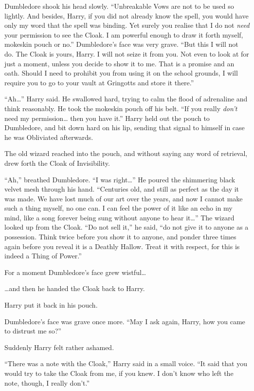Dumbledore shook his head slowly. ``Unbreakable Vows are not to be used
so lightly. And besides, Harry, if you did not already know the spell,
you would have only my word that the spell was binding. Yet surely you
realise that I do not \emph{need} your permission to see the Cloak. I am
powerful enough to draw it forth myself, mokeskin pouch or no.''
Dumbledore's face was very grave. ``But this I will not do. The Cloak is
yours, Harry. I will not seize it from you. Not even to look at for just
a moment, unless you decide to show it to me. That is a promise and an
oath. Should I need to prohibit you from using it on the school grounds,
I will require you to go to your vault at Gringotts and store it
there.''

``Ah\ldots{}'' Harry said. He swallowed hard, trying to calm the flood
of adrenaline and think reasonably. He took the mokeskin pouch off his
belt. ``If you really \emph{don't} need my permission\ldots{} then you
have it.'' Harry held out the pouch to Dumbledore, and bit down hard on
his lip, sending that signal to himself in case he was Obliviated
afterwards.

The old wizard reached into the pouch, and without saying any word of
retrieval, drew forth the Cloak of Invisibility.

``Ah,'' breathed Dumbledore. ``I was right\ldots{}'' He poured the
shimmering black velvet mesh through his hand. ``Centuries old, and
still as perfect as the day it was made. We have lost much of our art
over the years, and now I cannot make such a thing myself, no one can. I
can feel the power of it like an echo in my mind, like a song forever
being sung without anyone to hear it\ldots{}'' The wizard looked up from
the Cloak. ``Do not sell it,'' he said, ``do not give it to anyone as a
possession. Think twice before you show it to anyone, and ponder three
times again before you reveal it is a Deathly Hallow. Treat it with
respect, for this is indeed a Thing of Power.''

For a moment Dumbledore's face grew wistful\ldots{}

\ldots{}and then he handed the Cloak back to Harry.

Harry put it back in his pouch.

Dumbledore's face was grave once more. ``May I ask again, Harry, how you
came to distrust me so?''

Suddenly Harry felt rather ashamed.

``There was a note with the Cloak,'' Harry said in a small voice. ``It
said that you would try to take the Cloak from me, if you knew. I don't
know who left the note, though, I really don't.''

